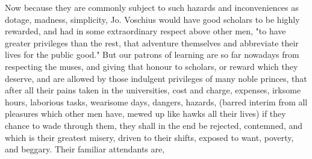 Now because they are commonly subject to such hazards and inconveniences as
dotage, madness, simplicity, \etc{} Jo. Voschius would have good scholars to be
highly rewarded, and had in some extraordinary respect above other men, "to
have greater privileges than the rest, that adventure
themselves and abbreviate their lives for the public good." But our patrons of
learning are so far nowadays from respecting the muses, and giving that honour
to scholars, or reward which they deserve, and are allowed by those indulgent
privileges of many noble princes, that after all their pains taken in the
universities, cost and charge, expenses, irksome hours, laborious tasks,
wearisome days, dangers, hazards, (barred interim from all pleasures which
other men have, mewed up like hawks all their lives) if they chance to wade
through them, they shall in the end be rejected, contemned, and which is their
greatest misery, driven to their shifts, exposed to want, poverty, and beggary.
Their familiar attendants are,


